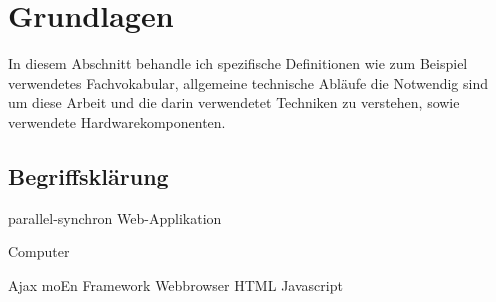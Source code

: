\chapter{Grundlagen}
In diesem Abschnitt behandle ich spezifische Definitionen wie zum Beispiel verwendetes Fachvokabular, allgemeine technische Abläufe die Notwendig sind um diese Arbeit und die darin verwendetet Techniken zu verstehen, sowie verwendete Hardwarekomponenten.

	\section{Begriffsklärung}	
		\Gls{parallel-synchron}
		\Gls{Web-Applikation}

		\Gls{Computer}

		\Gls{Ajax}
		\Gls{moEn}
		\Gls{Framework}
		\Gls{Webbrowser}
		\Gls{HTML}
		\Gls{Javascript}
		
